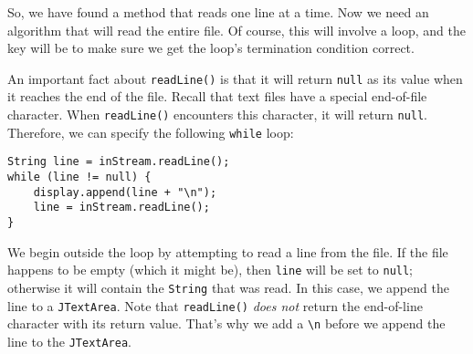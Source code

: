 So, we have found a method that reads one line at a time.  Now we need an
algorithm that will read the entire file.  Of course, this will involve
a loop, and the key will be to make sure we get the loop's termination
condition correct.  

An important fact about {\tt readLine()} 
is that it
will return {\tt null} as its value when it reaches the end of the
file.   Recall that text files have a special end-of-file character.
When {\tt readLine()} encounters this character, it will return
{\tt null}. Therefore, we can specify the following {\tt while} loop:

\begin{jjjlisting}
\begin{lstlisting}
String line = inStream.readLine();
while (line != null) {
    display.append(line + "\n");
    line = inStream.readLine();
}
\end{lstlisting}
\end{jjjlisting}

\noindent We begin outside the loop by attempting to
read a line from the file.  If the file happens to be empty (which it
might be), then {\tt line} will be set to {\tt null}; otherwise it will
contain the {\tt String} that was read.  In this case, we append the
line to a {\tt JTextArea}. Note that {\tt readLine()} {\it does not}
return the end-of-line character with its return value.  That's why we
add a \verb|\n| before we append the line to the {\tt JTextArea}.




